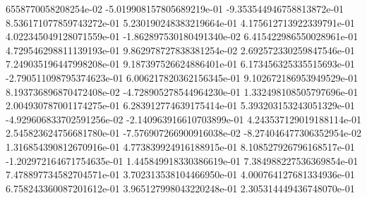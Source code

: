 6558770058208254e-02	-5.019908157805689219e-01	-9.353544946758813872e-01	8.536171077859743272e-01	5.230190248383219664e-01	4.175612713922339791e-01	4.022345049128071559e-01	-1.862897530180491340e-02	6.415422986550028961e-01	4.729546298811139193e-01	9.862978727838381254e-02	2.692572330259847546e-01	7.249035196447998208e-01	9.187397526624886401e-01	6.173456325335515693e-01	-2.790511098795374623e-01	6.006217820362156345e-01	9.102672186953949529e-01	8.193736896870472408e-02	-4.728905278544964230e-01	1.332498108505797696e-01	2.004930787001174275e-01	6.283912774639175414e-01	5.393203153243051329e-01	-4.929606833702591256e-02	-2.140963916610703899e-01	4.243537129019188114e-01	2.545823624756681780e-01	-7.576907266900916038e-02	-8.274046477306352954e-02	1.316854390812670916e-01	4.773839924916188915e-01	8.108527926796168517e-01	-1.202972164671754635e-01	1.445849918330386619e-01	7.384988227536369854e-01	7.478897734582704571e-01	3.702313538104466950e-01	4.000764127681334936e-01	6.758243360087201612e-01	3.965127998043220248e-01	2.305314449436748070e-01
